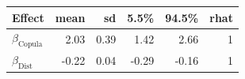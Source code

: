 
\begin{tabular}[t]{lrrrrr}
\toprule
Effect & mean & sd & 5.5\% & 94.5\% & rhat\\
\midrule
$\beta_{\text{Copula}}$ & 2.03 & 0.39 & 1.42 & 2.66 & 1\\
$\beta_{\text{Dist}}$ & -0.22 & 0.04 & -0.29 & -0.16 & 1\\
\bottomrule
\end{tabular}
